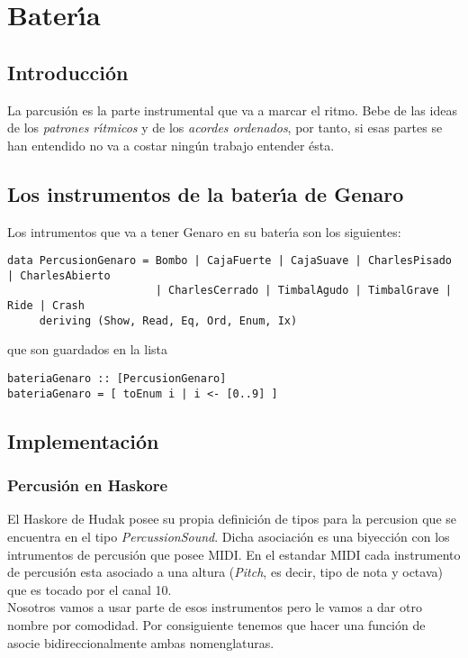 \chapter{Bater\'\i a}

\section{Introducci\'on}
La parcusi\'on es la parte instrumental que va a marcar el ritmo. Bebe de las ideas
de los \emph{patrones r\'\i tmicos} y de los \emph{acordes ordenados}, por tanto, si esas partes
se han entendido no va a costar ning\'un trabajo entender \'esta.

\section{Los instrumentos de la bater\'\i a de Genaro}
Los intrumentos que va a tener Genaro en su bater\'\i a son los siguientes:
\small
\begin{verbatim}
data PercusionGenaro = Bombo | CajaFuerte | CajaSuave | CharlesPisado | CharlesAbierto
                       | CharlesCerrado | TimbalAgudo | TimbalGrave | Ride | Crash
     deriving (Show, Read, Eq, Ord, Enum, Ix)
\end{verbatim}
\normalsize
que son guardados en la lista
\small
\begin{verbatim}
bateriaGenaro :: [PercusionGenaro]
bateriaGenaro = [ toEnum i | i <- [0..9] ]
\end{verbatim}
\normalsize

\section{Implementaci\'on}

\subsection{Percusi\'on en Haskore}
El Haskore de Hudak posee su propia definici\'on de tipos para la percusion que
se encuentra en el tipo \emph{PercussionSound}. Dicha asociaci\'on es una biyecci\'on
con los intrumentos de percusi\'on que posee MIDI. En el estandar MIDI cada
instrumento de percusi\'on esta asociado a una altura (\emph{Pitch}, es decir, tipo de nota y octava)
que es tocado por el canal 10.\\
\indent Nosotros vamos a usar parte de esos instrumentos pero le vamos a dar otro nombre por
comodidad. Por consiguiente tenemos que hacer una funci\'on de asocie bidireccionalmente
ambas nomenglaturas.

